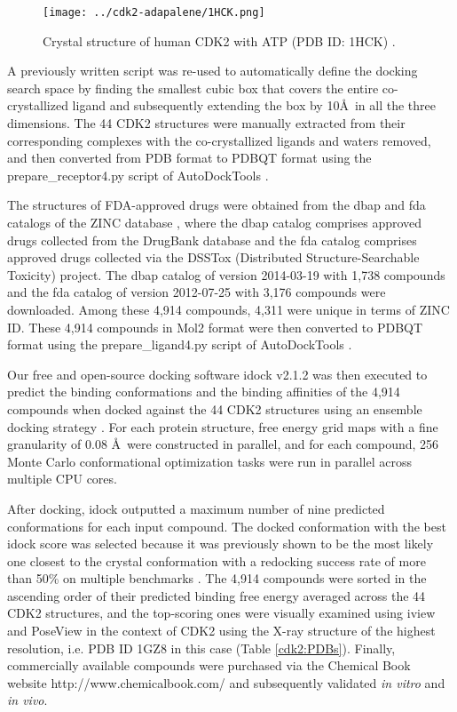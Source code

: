 \begin{figure}
\centering
\texttt{[image: ../cdk2-adapalene/1HCK.png]}
\caption{Crystal structure of human CDK2 with ATP (PDB ID: 1HCK) \cite{1142}.}
\label{cdk2:1HCK}
\end{figure}

A previously written script \citep{1362} was re-used to automatically define the docking search space by finding the smallest cubic box that covers the entire co-crystallized ligand and subsequently extending the box by 10\AA\ in all the three dimensions. The 44 CDK2 structures were manually extracted from their corresponding complexes with the co-crystallized ligands and waters removed, and then converted from PDB format to PDBQT format using the prepare\_receptor4.py script of AutoDockTools \citep{596}.

The structures of FDA-approved drugs were obtained from the dbap and fda catalogs of the ZINC database \citep{532,1178}, where the dbap catalog comprises approved drugs collected from the DrugBank database \citep{1594} and the fda catalog comprises approved drugs collected via the DSSTox (Distributed Structure-Searchable Toxicity) project. The dbap catalog of version 2014-03-19 with 1,738 compounds and the fda catalog of version 2012-07-25 with 3,176 compounds were downloaded. Among these 4,914 compounds, 4,311 were unique in terms of ZINC ID. These 4,914 compounds in Mol2 format were then converted to PDBQT format using the prepare\_ligand4.py script of AutoDockTools \citep{596}.

Our free and open-source docking software idock v2.1.2 \citep{1362} was then executed to predict the binding conformations and the binding affinities of the 4,914 compounds when docked against the 44 CDK2 structures using an ensemble docking strategy \citep{966,547,1128}. For each protein structure, free energy grid maps with a fine granularity of 0.08 \AA\ were constructed in parallel, and for each compound, 256 Monte Carlo conformational optimization tasks were run in parallel across multiple CPU cores.

After docking, idock outputted a maximum number of nine predicted conformations for each input compound. The docked conformation with the best idock score was selected because it was previously shown to be the most likely one closest to the crystal conformation with a redocking success rate of more than 50\% on multiple benchmarks \citep{1362}. The 4,914 compounds were sorted in the ascending order of their predicted binding free energy averaged across the 44 CDK2 structures, and the top-scoring ones were visually examined using iview \citep{1366} and PoseView \citep{748} in the context of CDK2 using the X-ray structure of the highest resolution, i.e. PDB ID 1GZ8 in this case (Table \ref{cdk2:PDBs}). Finally, commercially available compounds were purchased via the Chemical Book website http://www.chemicalbook.com/ and subsequently validated \textit{in vitro} and \textit{in vivo}.

